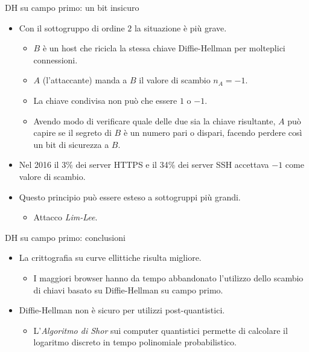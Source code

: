 \documentclass[11pt,svgnames,smaller,aspectratio=169,italian]{beamer}
\begin{document}
\begin{frame}{DH su campo primo: un bit insicuro}
	\begin{itemize}
		\item Con il sottogruppo di ordine $2$ la situazione è più grave.
			\begin{itemize}
				\item $B$ è un host che ricicla la stessa chiave Diffie-Hellman per molteplici connessioni.
				\item $A$ (l'attaccante) manda a $B$ il valore di scambio $n_{A} = -1$.
				\item La chiave condivisa non può che essere $1$ o $-1$.
				\item Avendo modo di verificare quale delle due sia la chiave risultante, $A$ può capire se il segreto di $B$ è un numero pari o dispari, facendo perdere così un bit di sicurezza a $B$.
			\end{itemize}
		\item Nel 2016 il 3\% dei server HTTPS e il 34\% dei server SSH accettava $-1$ come valore di scambio.
		\item Questo principio può essere esteso a sottogruppi più grandi.
			\begin{itemize}
				\item Attacco \emph{Lim-Lee}. %
			\end{itemize}
	\end{itemize}
\end{frame}


\begin{frame}{DH su campo primo: conclusioni}
	\begin{itemize}
		\item La crittografia su curve ellittiche risulta migliore.
			\begin{itemize}
				\item I maggiori browser hanno da tempo abbandonato l'utilizzo dello scambio di chiavi basato su Diffie-Hellman su campo primo.
			\end{itemize}
		\item Diffie-Hellman non è sicuro per utilizzi post-quantistici.
			\begin{itemize}
				\item L'\emph{Algoritmo di Shor} sui computer quantistici permette di calcolare il logaritmo discreto in tempo polinomiale probabilistico.
			\end{itemize}
	\end{itemize}
\end{frame}
\end{document}
